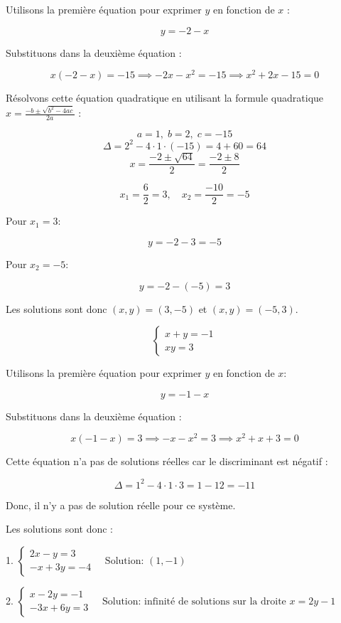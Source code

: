 \documentclass[12pt]{article}
\begin{document}
Utilisons la première équation pour exprimer \( y \) en fonction de \( x \) :

\[
y = -2 - x
\]

Substituons dans la deuxième équation :

\[
x(-2 - x) = -15 \implies -2x - x^2 = -15 \implies x^2 + 2x - 15 = 0
\]

Résolvons cette équation quadratique en utilisant la formule quadratique \( x = \frac{-b \pm \sqrt{b^2 - 4ac}}{2a} \) :

\[
a = 1, \; b = 2, \; c = -15
\]
\[
\Delta = 2^2 - 4 \cdot 1 \cdot (-15) = 4 + 60 = 64
\]
\[
x = \frac{-2 \pm \sqrt{64}}{2} = \frac{-2 \pm 8}{2}
\]

\[
x_1 = \frac{6}{2} = 3, \quad x_2 = \frac{-10}{2} = -5
\]

Pour \( x_1 = 3 \):

\[
y = -2 - 3 = -5
\]

Pour \( x_2 = -5 \):

\[
y = -2 - (-5) = 3
\]

Les solutions sont donc \( (x, y) = (3, -5) \) et \( (x, y) = (-5, 3) \).

\[
\begin{cases}
x + y = -1 \\
xy = 3
\end{cases}
\]

Utilisons la première équation pour exprimer \( y \) en fonction de \( x \):

\[
y = -1 - x
\]

Substituons dans la deuxième équation :

\[
x(-1 - x) = 3 \implies -x - x^2 = 3 \implies x^2 + x + 3 = 0
\]

Cette équation n'a pas de solutions réelles car le discriminant est négatif :

\[
\Delta = 1^2 - 4 \cdot 1 \cdot 3 = 1 - 12 = -11
\]

Donc, il n'y a pas de solution réelle pour ce système.

Les solutions sont donc :

1. \( \begin{cases}
2x - y = 3 \\
-x + 3y = -4
\end{cases} \quad \text{Solution: } (1, -1) \)

2. \( \begin{cases}
x - 2y = -1 \\
-3x + 6y = 3
\end{cases} \quad \text{Solution: infinité de solutions sur la droite } x = 2y - 1 \)
\end{document}
